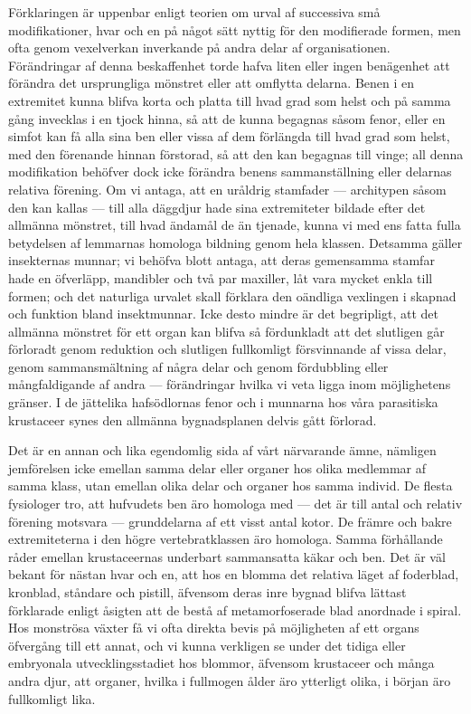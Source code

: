 Förklaringen är uppenbar enligt teorien om urval af successiva små modifikationer, hvar och en på något sätt nyttig för den modifierade formen, men ofta genom vexelverkan inverkande på andra delar af organisationen. Förändringar af denna beskaffenhet torde hafva liten eller ingen benägenhet att förändra det ursprungliga mönstret eller att omflytta delarna. Benen i en extremitet kunna blifva korta och platta till hvad grad som helst och på samma gång invecklas i en tjock hinna, så att de kunna begagnas såsom fenor, eller en simfot kan få alla sina ben eller vissa af dem förlängda till hvad grad som helst, med den förenande hinnan förstorad, så att den kan begagnas till vinge; all denna modifikation behöfver dock icke förändra benens sammanställning eller delarnas relativa förening. Om vi antaga, att en uråldrig stamfader — architypen såsom den kan kallas — till alla däggdjur hade sina extremiteter bildade efter det allmänna mönstret, till hvad ändamål de än tjenade, kunna vi med ens fatta fulla betydelsen af lemmarnas homologa bildning genom hela klassen. Detsamma gäller insekternas munnar; vi behöfva blott antaga, att deras gemensamma stamfar hade en öfverläpp, mandibler och två par maxiller, låt vara mycket enkla till formen; och det naturliga urvalet skall förklara den oändliga vexlingen i skapnad och funktion bland insektmunnar. Icke desto mindre är det begripligt, att det allmänna mönstret för ett organ kan blifva så fördunkladt att det slutligen går förloradt genom reduktion och slutligen fullkomligt försvinnande af vissa delar, genom sammansmältning af några delar och genom fördubbling eller mångfaldigande af andra — förändringar hvilka vi veta ligga inom möjlighetens gränser. I de jättelika hafsödlornas fenor och i munnarna hos våra parasitiska krustaceer synes den allmänna bygnadsplanen delvis gått förlorad.

Det är en annan och lika egendomlig sida af vårt närvarande ämne, nämligen jemförelsen icke emellan samma delar eller organer hos olika medlemmar af samma klass, utan emellan olika delar och organer hos samma individ. De flesta fysiologer tro, att hufvudets ben äro homologa med — det är till antal och relativ förening motsvara — grunddelarna af ett visst antal kotor. De främre och bakre extremiteterna i den högre vertebratklassen äro homologa. Samma förhållande råder emellan krustaceernas underbart sammansatta käkar och ben. Det är väl bekant för nästan hvar och en, att hos en blomma det relativa läget af foderblad, kronblad, ståndare och pistill, äfvensom deras inre bygnad blifva lättast förklarade enligt åsigten att de bestå af metamorfoserade blad anordnade i spiral. Hos monströsa växter få vi ofta direkta bevis på möjligheten af ett organs öfvergång till ett annat, och vi kunna verkligen se under det tidiga eller embryonala utvecklingsstadiet hos blommor, äfvensom krustaceer och många andra djur, att organer, hvilka i fullmogen ålder äro ytterligt olika, i början äro fullkomligt lika.

